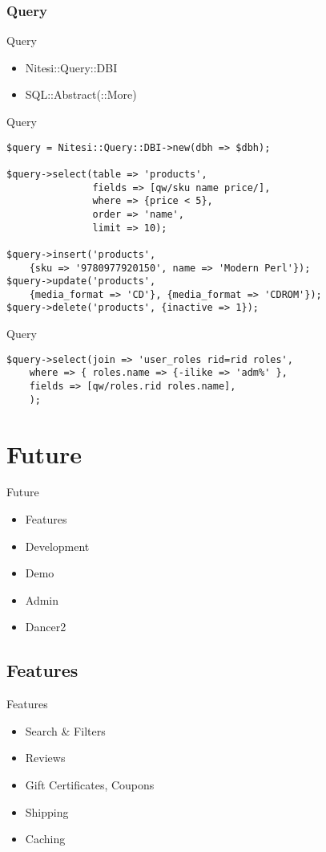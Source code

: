 \subsubsection{Query}
\begin{frame}{Query}
\begin{itemize}
\item Nitesi::Query::DBI
\item SQL::Abstract(::More)
\end{itemize}
\end{frame}

\begin{frame}[fragile]{Query}
\begin{lstlisting}
$query = Nitesi::Query::DBI->new(dbh => $dbh);
 
$query->select(table => 'products',
               fields => [qw/sku name price/],
               where => {price < 5},
               order => 'name',
               limit => 10);
 
$query->insert('products', 
    {sku => '9780977920150', name => 'Modern Perl'});
$query->update('products', 
    {media_format => 'CD'}, {media_format => 'CDROM'});
$query->delete('products', {inactive => 1});
\end{lstlisting}
\end{frame}

\begin{frame}[fragile]{Query}
\begin{lstlisting}
$query->select(join => 'user_roles rid=rid roles',
    where => { roles.name => {-ilike => 'adm%' },
    fields => [qw/roles.rid roles.name],
    );
\end{lstlisting}
\end{frame}

\section{Future}
\begin{frame}{Future}
\begin{itemize}
\item Features
\item Development
\item Demo
\item Admin
\item Dancer2
\end{itemize}
\end{frame}

\subsection{Features}
\begin{frame}{Features}
\begin{itemize}
\item Search \&  Filters
\item Reviews
\item Gift Certificates, Coupons
\item Shipping
\item Caching
\end{itemize}
\end{frame}


